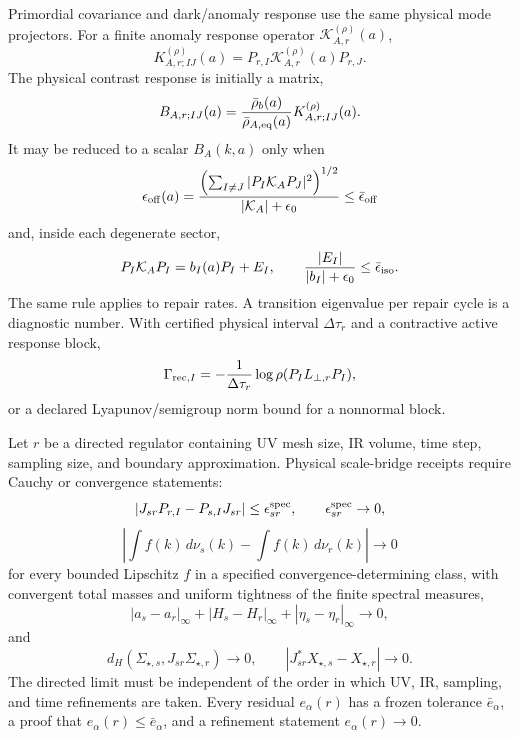 \begin{theorem}\label{thm:common-primordial-anomaly-basis}
Primordial covariance and dark/anomaly response use the same physical mode projectors.  For a finite
anomaly response operator \(\mathcal K_{A,r}^{(\rho)}(a)\),
\[
K_{A,r;IJ}^{(\rho)}(a)=
P_{r,I}\mathcal K_{A,r}^{(\rho)}(a)P_{r,J}.
\]
The physical contrast response is initially a matrix,
\[
B_{A,r;IJ}(a)=
\frac{\bar\rho_b(a)}{\bar\rho_{A,\rm eq}(a)}
K_{A,r;IJ}^{(\rho)}(a).
\]
It may be reduced to a scalar \(B_A(k,a)\) only when
\[
\epsilon_{\rm off}(a)=
\frac{\left(\sum_{I\ne J}|P_I\mathcal K_AP_J|^2\right)^{1/2}}
{|\mathcal K_A|+\epsilon_0}
\le\bar\epsilon_{\rm off}
\]
and, inside each degenerate sector,
\[
P_I\mathcal K_AP_I=b_I(a)P_I+E_I,\qquad
\frac{|E_I|}{|b_I|+\epsilon_0}\le\bar\epsilon_{\rm iso}.
\]
The same rule applies to repair rates.  A transition eigenvalue per repair cycle is a diagnostic
number.  With certified physical interval \(\Delta\tau_r\) and a contractive active response block,
\[
\Gamma_{{\rm rec},I}
=-\frac1{\Delta\tau_r}\log\rho(P_IL_{\perp,r}P_I),
\]
or a declared Lyapunov/semigroup norm bound for a nonnormal block.
\end{theorem}

\begin{theorem}\label{thm:scale-bridge-regulator-convergence}
Let \(r\) be a directed regulator containing UV mesh size, IR volume, time step, sampling size, and
boundary approximation.  Physical scale-bridge receipts require Cauchy or convergence statements:
\[
\left|J_{sr}P_{r,I}-P_{s,I}J_{sr}\right|\le\epsilon_{sr}^{\rm spec},\qquad
\epsilon_{sr}^{\rm spec}\to0,
\]
\[
\left|\int f(k)\,d\nu_s(k)-\int f(k)\,d\nu_r(k)\right|\to0
\]
for every bounded Lipschitz \(f\) in a specified convergence-determining
class, with convergent total masses and uniform tightness of the finite
spectral measures,
\[
|a_s-a_r|_\infty+|H_s-H_r|_\infty+|\eta_s-\eta_r|_\infty\to0,
\]
and
\[
d_H(\Sigma_{\star,s},J_{sr}\Sigma_{\star,r})\to0,\qquad
\left|J_{sr}^{*}X_{\star,s}-X_{\star,r}\right|\to0.
\]
The directed limit must be independent of the order in which UV, IR, sampling, and time refinements
are taken.  Every residual \(e_\alpha(r)\) has a frozen tolerance \(\bar e_\alpha\), a proof that
\(e_\alpha(r)\le\bar e_\alpha\), and a refinement statement \(e_\alpha(r)\to0\).
\end{theorem}


